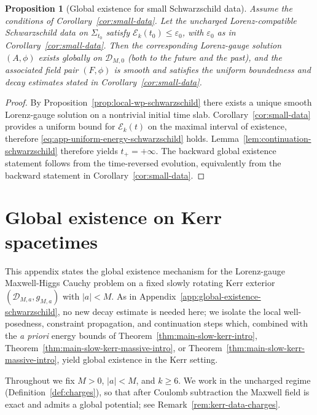 \documentclass[11pt]{article}
\numberwithin{equation}{section}
\theoremstyle{plain}
\newtheorem{proposition}[theorem]{Proposition}
\theoremstyle{definition}
\theoremstyle{remark}
\begin{document}
\begin{proposition}[Global existence for small Schwarzschild data]\label{prop:global-existence-schwarzschild}
Assume the conditions of Corollary~\ref{cor:small-data}.
Let the uncharged Lorenz-compatible Schwarzschild data on $\Sigma_{t_{0}}$ satisfy $\mathcal E_k(t_0)\le \varepsilon_0$, with $\varepsilon_0$ as in Corollary~\ref{cor:small-data}.
Then the corresponding Lorenz-gauge solution $(A,\phi)$ exists globally on $\mathcal D_{M,0}$ (both to the future and the past),
and the associated field pair $(F,\phi)$ is smooth and satisfies the uniform boundedness and decay estimates stated in Corollary~\ref{cor:small-data}.
\end{proposition}

\begin{proof}
By Proposition~\ref{prop:local-wp-schwarzschild} there exists a unique smooth Lorenz-gauge solution on a nontrivial initial time slab.
Corollary~\ref{cor:small-data} provides a uniform bound for $\mathcal E_k(t)$ on the maximal interval of existence, therefore \eqref{eq:app-uniform-energy-schwarzschild} holds.
Lemma~\ref{lem:continuation-schwarzschild} therefore yields $t_+=+\infty$.
The backward global existence statement follows from the time-reversed evolution, equivalently from the backward statement in Corollary~\ref{cor:small-data}.
\end{proof}



\section{Global existence on Kerr spacetimes}
\label{app:global-existence-kerr}

This appendix states the global existence mechanism for the Lorenz-gauge Maxwell-Higgs Cauchy problem on a fixed slowly rotating Kerr exterior
$(\mathcal D_{M,a},g_{M,a})$ with $|a|<M$.
As in Appendix~\ref{app:global-existence-schwarzschild}, no new decay estimate is needed here; we isolate the local well-posedness,
constraint propagation, and continuation steps which, combined with the \emph{a priori} energy bounds of Theorem~\ref{thm:main-slow-kerr-intro}, Theorem~\ref{thm:main-slow-kerr-massive-intro}, or Theorem~\ref{thm:main-slow-kerr-massive-intro},
yield global existence in the Kerr setting.

Throughout we fix $M>0$, $|a|<M$, and $k\ge 6$.
We work in the uncharged regime (Definition~\ref{def:charges}), so that after Coulomb subtraction the Maxwell field is exact and admits a global potential; see Remark~\ref{rem:kerr-data-charges}.
\end{document}
